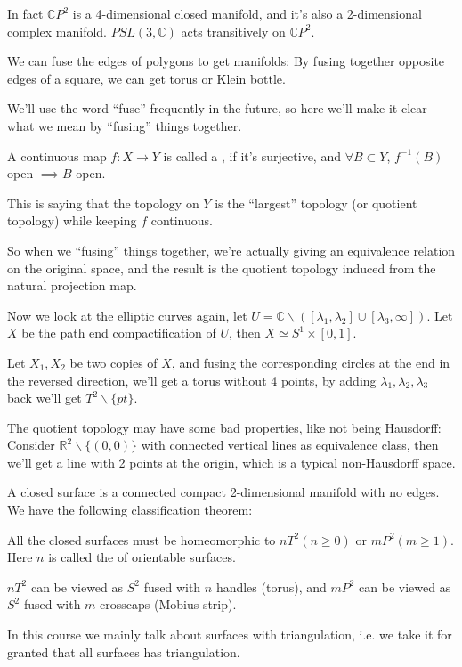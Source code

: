 In fact $\mathbb{C}P^2$ is a 4-dimensional closed manifold,
and it's also a 2-dimensional complex manifold.
$PSL(3, \mathbb{C})$ acts transitively on $\mathbb{C}P^2$.

\begin{example}
    We can fuse the edges of polygons to get manifolds:
	By fusing together opposite edges of a square,
	we can get torus or Klein bottle.
\end{example}

We'll use the word ``fuse'' frequently in the future,
so here we'll make it clear what we mean by ``fusing'' things together.

\begin{definition}
	A continuous map $f: X\to Y$ is called a ,
	if it's surjective, and $\forall B \subset Y$,
	$f^{-1}(B)$ open $\implies B$ open.

	This is saying that the topology on $Y$ is the ``largest''
	topology (or quotient topology) while keeping $f$ continuous.
\end{definition}

So when we ``fusing'' things together, we're actually giving an
equivalence relation on the original space, and the result
is the quotient topology induced from the natural projection map.

Now we look at the elliptic curves again,
let $U = \mathbb{C} \backslash ([\lambda_1,\lambda_2]\cup [\lambda_3, \infty])$.
Let $X$ be the path end compactification of $U$, then $X\simeq S^1\times [0,1]$.

Let $X_1, X_2$ be two copies of $X$, and fusing the corresponding circles
at the end in the reversed direction, we'll get a torus without 4 points,
by adding $\lambda_1, \lambda_2, \lambda_3$ back we'll get $T^2\backslash\{pt\}$.

\begin{remark}
    The quotient topology may have some bad properties, like not being Hausdorff:
	Consider $\mathbb{R}^2\backslash\{(0,0)\}$ with connected vertical lines
	as equivalence class, then we'll get a line with 2 points at the origin,
	which is a typical non-Hausdorff space.
\end{remark}

A closed surface is a connected compact 2-dimensional manifold with no edges.
We have the following classification theorem:
\begin{theorem}
    All the closed surfaces must be homeomorphic to $nT^2 (n\ge 0)$ or $mP^2 (m\ge 1)$.
	Here $n$ is called the  of orientable surfaces.

	$nT^2$ can be viewed as $S^2$ fused with $n$ handles (torus),
	and $mP^2$ can be viewed as $S^2$ fused with $m$ crosscaps (Mobius strip).
\end{theorem}
In this course we mainly talk about surfaces with triangulation, i.e.
we take it for granted that all surfaces has triangulation.

